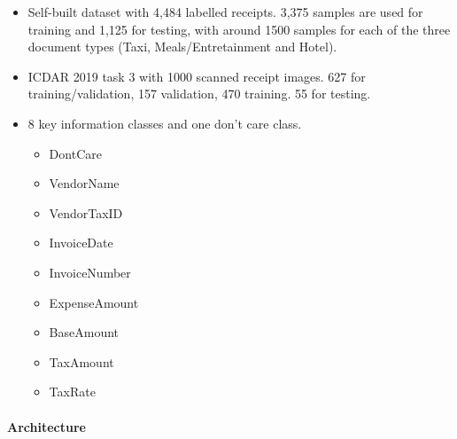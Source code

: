 \documentclass[]{article}
\providecommand{\tightlist}{%
  \setlength{\itemsep}{0pt}\setlength{\parskip}{0pt}}
\let\oldparagraph\paragraph
\renewcommand{\paragraph}[1]{\oldparagraph{#1}\mbox{}}
\begin{document}
\begin{itemize}
\tightlist
\item
  Self-built dataset with 4,484 labelled receipts. 3,375 samples are used for training and 1,125 for testing, with around 1500 samples for each of the three document types (Taxi, Meals/Entretainment and Hotel).
\item
  ICDAR 2019 task 3 with 1000 scanned receipt images. 627 for training/validation, 157 validation, 470 training. 55 for testing.
\item
  8 key information classes and one don't care class.

  \begin{itemize}
  \tightlist
  \item
    DontCare
  \item
    VendorName
  \item
    VendorTaxID
  \item
    InvoiceDate
  \item
    InvoiceNumber
  \item
    ExpenseAmount
  \item
    BaseAmount
  \item
    TaxAmount
  \item
    TaxRate
  \end{itemize}
\end{itemize}

\hypertarget{architecture}{%
\paragraph{Architecture}\label{architecture}}
\end{document}
